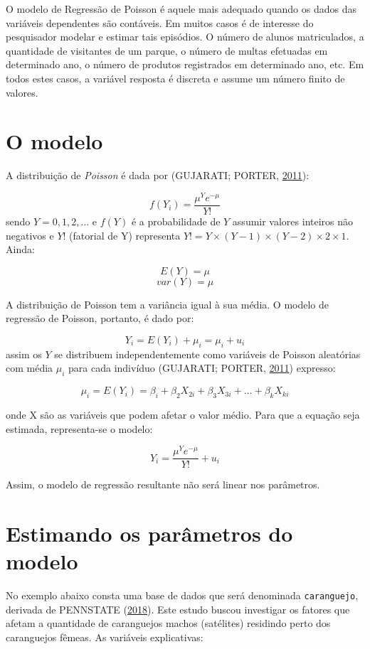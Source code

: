 \documentclass[12pt,brazil,oneside]{book}
\begin{document}
O modelo de Regressão de Poisson é aquele mais adequado quando os dados
das variáveis dependentes são contáveis. Em muitos casos é de interesse
do pesquisador modelar e estimar tais episódios. O número de alunos
matriculados, a quantidade de visitantes de um parque, o número de
multas efetuadas em determinado ano, o número de produtos registrados em
determinado ano, etc. Em todos estes casos, a variável resposta é
discreta e assume um número finito de valores.

\hypertarget{o-modelo-1}{%
\section{O modelo}\label{o-modelo-1}}

A distribuição de \emph{Poisson} é dada por (GUJARATI; PORTER,
\protect\hyperlink{ref-Gujarati2011}{2011}):

\[
f(Y_i) = \frac{\mu^{Y}e^{-\mu}}{Y!}
\] sendo \(Y=0,1,2,...\) e \(f(Y)\) é a probabilidade de \(Y\) assumir
valores inteiros não negativos e \(Y!\) (fatorial de Y) representa
\(Y! = Y \times (Y-1) \times (Y-2) \times 2 \times 1\). Ainda:

\[
E(Y) = \mu
\] \[
var(Y) = \mu
\]

A distribuição de Poisson tem a variância igual à sua média. O modelo de
regressão de Poisson, portanto, é dado por:

\[
Y_i = E(Y_i) +\mu_i = \mu_i + u_i
\] assim os \(Y\) se distribuem independentemente como variáveis de
Poisson aleatórias com média \(\mu_i\) para cada indivíduo (GUJARATI;
PORTER, \protect\hyperlink{ref-Gujarati2011}{2011}) expresso:

\[
\mu_i = E(Y_i) = \beta_{i} + \beta _{2} X_{2i} + \beta_{3} X_{3i} + \dots + \beta_{k} X_{ki}
\]

onde X são as variáveis que podem afetar o valor médio. Para que a
equação seja estimada, representa-se o modelo:

\[
Y_i = \frac{\mu^{Y}e^{-\mu}}{Y!} + u_i
\]

Assim, o modelo de regressão resultante não será linear nos parâmetros.

\hypertarget{estimando-os-parametros-do-modelo}{%
\section{Estimando os parâmetros do
modelo}\label{estimando-os-parametros-do-modelo}}

No exemplo abaixo consta uma base de dados que será denominada
\texttt{caranguejo}, derivada de PENNSTATE
(\protect\hyperlink{ref-penn2018}{2018}). Este estudo buscou investigar
os fatores que afetam a quantidade de caranguejos machos (satélites)
residindo perto dos caranguejos fêmeas. As variáveis explicativas:
\end{document}
